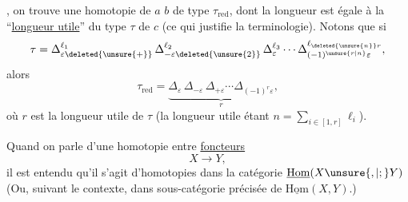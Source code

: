 ,  on trouve une homotopie de $a$  $b$ de type $\tau_{\mathrm{red}}$, dont la longueur est égale à la ``\uline{longueur utile}'' du type $\tau$ de $c$ (ce qui justifie la terminologie).
Notons que si
\[\tau=\Delta_{\varepsilon\deleted{\unsure{+}}}^{\ell_1}\,\Delta_{-\varepsilon\deleted{\unsure{2}}}^{\ell_2}\,\Delta_\varepsilon^{\ell_3}\cdots\Delta_{(-1)^{\unsure{r|n}}\varepsilon}^{\ell_{\deleted{\unsure{n}}r}},\]
alors
\[\tau_{\mathrm{red}}=\underbrace{\Delta_\varepsilon\,\Delta_{-\varepsilon}\,\Delta_{+\varepsilon}\cdots\Delta_{(-1)^r\varepsilon}}_{r},\]
où $r$ est la longueur utile de $\tau$ (la longueur  utile étant $n=\sum_{i\in[1,r]}\ell_i$).

Quand on parle d'une homotopie entre \uline{foncteurs}
\[X\longrightarrow Y,\]
il est entendu qu'il s'agit d'homotopies dans la catégorie $\underline{\mathrm{Hom}}(X\unsure{,|;}Y)$ (Ou, suivant le contexte, dans  sous-catégorie précisée de $\underline{\mathrm{Hom}}(X,Y)$.)
